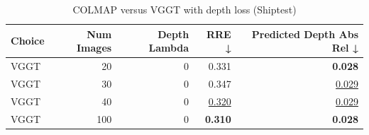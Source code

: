 \begin{table}[H]
\caption{COLMAP versus VGGT with depth loss (Shiptest)}
\label{tab:05_depth_lambda_num_images_shiptest}
\begin{tabular}{lrrrr}
\toprule
Choice & Num Images & Depth Lambda & RRE ↓ & Predicted Depth Abs Rel ↓ \\
\midrule
VGGT & 20 & 0 & 0.331 & \textbf{0.028} \\
VGGT & 30 & 0 & 0.347 & \underline{0.029} \\
VGGT & 40 & 0 & \underline{0.320} & \underline{0.029} \\
VGGT & 100 & 0 & \textbf{0.310} & \textbf{0.028} \\
\bottomrule
\end{tabular}
\end{table}
